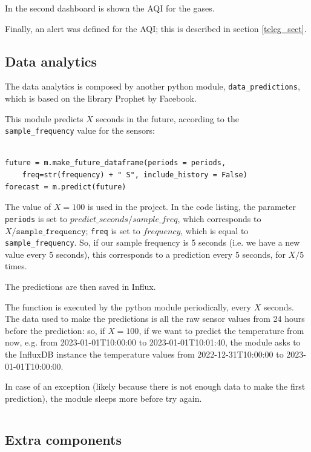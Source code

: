 \documentclass[]{article}
\begin{document}
In the second dashboard is shown the AQI for the gases. 

Finally, an alert was defined for the AQI; this is described in section \ref{teleg_sect}. 

\subsection{Data analytics}
The data analytics is composed by another python module, \texttt{data\_predictions}, which is based on the library Prophet by Facebook.

This module predicts $ X $ seconds in the future, according to the \texttt{sample\_frequency} value for the sensors:

\begin{lstlisting}[style=Python, caption=Prophet prediction ($ X $ is \texttt{frequency} in the example)]

future = m.make_future_dataframe(periods = periods, 
	freq=str(frequency) + " S", include_history = False)
forecast = m.predict(future)
\end{lstlisting}

The value of $ X = 100 $ is used in the project. In the code listing, the parameter \texttt{periods} is set to $ predict\_seconds/sample\_freq $, which corresponds to $ X / \texttt{sample\_frequency} $; \texttt{freq}  is set to $ frequency $, which is equal to \texttt{sample\_frequency}. So, if our sample frequency is 5 seconds (i.e. we have a new value every 5 seconds), this corresponds to a prediction every 5 seconds, for $ X/5 $ times. 

The predictions are then saved in Influx.

The function is executed by the python module periodically, every $ X  $ seconds. The data used to make the predictions is all the raw sensor values from 24 hours before the prediction: so, if $ X = 100 $, if we want to predict the temperature from now, e.g. from 2023-01-01T10:00:00 to 2023-01-01T10:01:40, the module asks to the InfluxDB instance the temperature values from 2022-12-31T10:00:00 to 2023-01-01T10:00:00. 

In case of an exception (likely because there is not enough data to make the first prediction), the module sleeps more before try again. 

\begin{lstlisting}
\end{lstlisting}

\subsection{Extra components}
\end{document}

